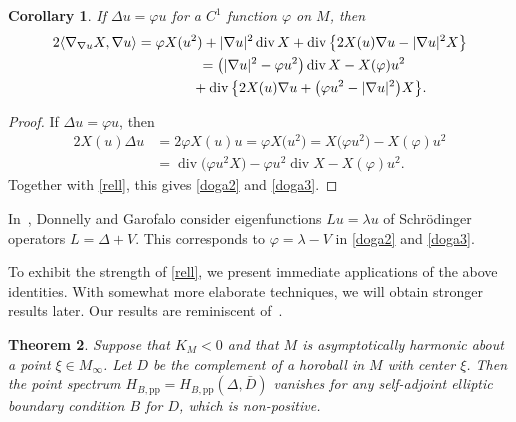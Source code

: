 \documentclass[pdftex]{sigma}
\numberwithin{equation}{section}
\newtheorem{Theorem}{Theorem}[section]
\newtheorem{Corollary}[Theorem]{Corollary}
\DeclareMathOperator{\diver}{div}
\def\p{\mathrm{pp}}
\begin{document}
\begin{Corollary}%
If $\Delta u=\varphi u$ for a $C^1$ function $\varphi$ on $M$, then
\begin{gather}
 2\langle\nabla_{\nabla u}X,\nabla u\rangle
= \varphi X(u^2) + |\nabla u|^2\diver X + \diver\big\{2X(u)\nabla u-|\nabla u|^2X\big\} \label{doga2} \\
\hphantom{2\langle\nabla_{\nabla u}X,\nabla u\rangle}{}= \bigl(|\nabla u|^2 - \varphi u^2\bigr)\diver X - X(\varphi)u^2 \notag\\
 \hphantom{2\langle\nabla_{\nabla u}X,\nabla u\rangle=}{}+ \diver\big\{2X(u)\nabla u+\bigl(\varphi u^2-|\nabla u|^2\bigr)X\big\}. \label{doga3}
\end{gather}
\end{Corollary}

\begin{proof}
If $\Delta u=\varphi u$, then
\begin{align*}
 2X(u)\Delta u &= 2\varphi X(u)u = \varphi X\bigl(u^2\bigr) = X\bigl(\varphi u^2\bigr) - X(\varphi)u^2 \\
 &= \diver\bigl(\varphi u^2X\bigr) - \varphi u^2\diver X - X(\varphi)u^2.
\end{align*}
Together with \eqref{rell}, this gives \eqref{doga2} and \eqref{doga3}.
\end{proof}

In~\cite{DoGa97}, Donnelly and Garofalo consider eigenfunctions $Lu=\lambda u$ of Schr\"odinger operators $L=\Delta+V$.
This corresponds to $\varphi=\lambda-V$ in \eqref{doga2} and \eqref{doga3}.

To exhibit the strength of \eqref{rell}, we present immediate applications of the above identities.
With somewhat more elaborate techniques, we will obtain stronger results later.
Our results are reminiscent of~\cite[Satz 2]{Rellich43}.

\begin{Theorem}\label{nopointd}
Suppose that $K_M<0$ and that $M$ is asymptotically harmonic about a point $\xi\in M_\infty$.
Let $D$ be the complement of a horoball in $M$ with center $\xi$.
Then the point spectrum $H_{B,\p}=H_{B,\p}(\Delta, \bar{D} )$ vanishes for any self-adjoint elliptic
boundary condition $B$ for $D$, which is non-positive.
\end{Theorem}
\end{document}
